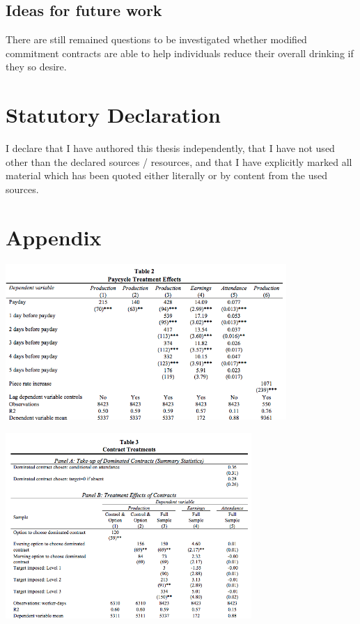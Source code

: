 \documentclass[a4paper,12pt]{article}
\begin{document}
\subsection{Ideas for future work}
There are still remained questions to be investigated whether modified commitment contracts are able to help individuals reduce their overall drinking if they so desire.  





\newpage



\newpage
\section{Statutory Declaration}
I declare that I have authored this thesis independently, that I have not used other than the declared sources / resources, and that I have explicitly marked all material which has been quoted either literally or by content from the used sources.

\newpage
\section{Appendix}

\begin{table}[h]
\centering
\includegraphics[width=0.8\textwidth]{Table2.png}
\caption{\label{fig:Table2}}
\end{table}

\begin{table}[h]
\centering
\includegraphics[width=0.7\textwidth]{Table3.png}
\caption{\label{fig:Table3}}
\end{table}
\end{document}
